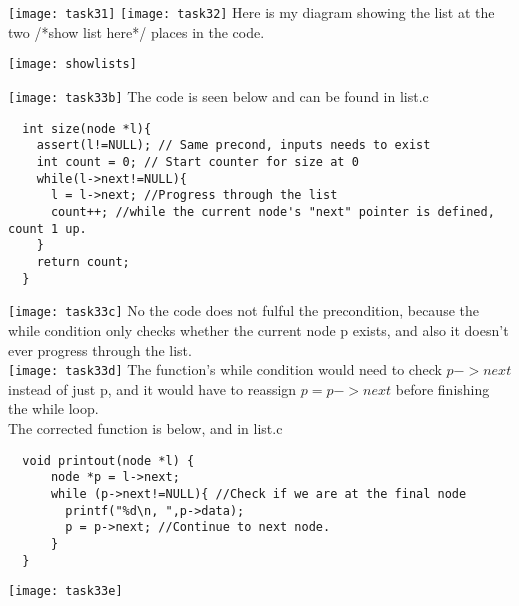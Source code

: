 \documentclass{article}
\begin{document}
\section{}
\texttt{[image: task31]} 
\texttt{[image: task32]} 
Here is my diagram showing the list at the two /*show list here*/ places in the code.\\
\begin{center} \texttt{[image: showlists]}
\end{center}
\vspace{10cm}
\texttt{[image: task33b]} 
The code is seen below and can be found in list.c
\begin{lstlisting}
  int size(node *l){
    assert(l!=NULL); // Same precond, inputs needs to exist
    int count = 0; // Start counter for size at 0
    while(l->next!=NULL){ 
      l = l->next; //Progress through the list
      count++; //while the current node's "next" pointer is defined, count 1 up.
    }
    return count;
  }
\end{lstlisting}
\vspace{1cm}
\texttt{[image: task33c]}
No the code does not fulful the precondition, because the while condition
only checks whether the current node p exists, and also it doesn't ever progress through the list.\\
\texttt{[image: task33d]}
The function's while condition would need to check $\si{p->next}$ instead of just p, and it would have to reassign $\si{p = p->next}$ before finishing the while loop.\\
The corrected function is below, and in list.c
\begin{lstlisting}
  void printout(node *l) {
      node *p = l->next;
      while (p->next!=NULL){ //Check if we are at the final node
        printf("%d\n, ",p->data);
        p = p->next; //Continue to next node.
      }
  }
\end{lstlisting}
\vspace{3cm}
\texttt{[image: task33e]}

\vspace{2pt}
\end{document}
